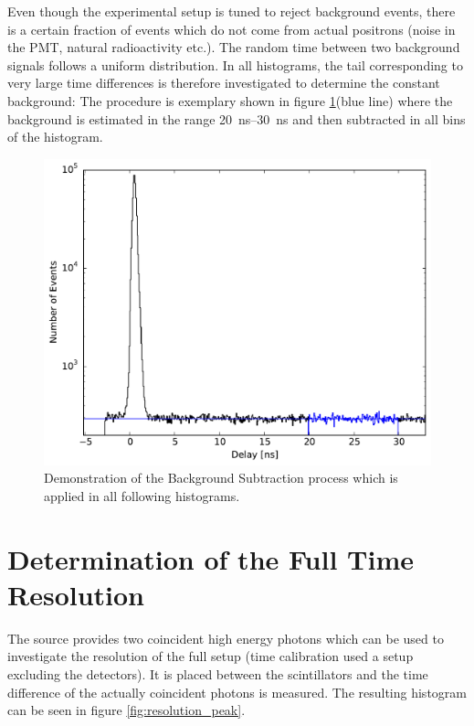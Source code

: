 \documentclass[
	paper=A4,
	parskip=full,
	chapterprefix=true,
	11pt,
	headings=normal,
	bibliography=totoc,
	listof=totoc,
	titlepage=on,
]{scrreprt}
\begin{document}
Even though the experimental setup is tuned to reject background events, there is a certain fraction of events which do not come from actual positrons (noise in the PMT, natural radioactivity etc.). The random time between two background signals follows a uniform distribution. In all histograms, the tail corresponding to very large time differences is therefore investigated to determine the constant background: The procedure is exemplary shown in figure \ref{fig:resolution_background}(blue line) where the background is estimated in the range \SIrange{20}{30}{\nano\second} and then subtracted in all bins of the histogram. 

\begin{figure}
	\centering
	\includegraphics{resolution_background}
	\caption{Demonstration of the Background Subtraction process which is applied in all following histograms.}
	\label{fig:resolution_background}
\end{figure}

\section{Determination of the Full Time Resolution}
The  source provides two coincident high energy photons which can be used to investigate the resolution of the full setup (time calibration used a setup excluding the detectors). It is placed between the scintillators and the time difference of the actually coincident photons is measured. The resulting histogram can be seen in figure \ref{fig:resolution_peak}. 
\end{document}
